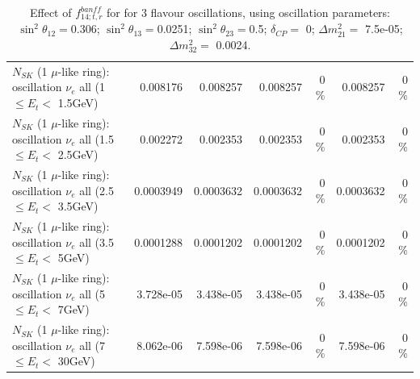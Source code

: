 \begin{table}
\begin{tabular}{| l | r | r | r  r | r  r |}
$N_{SK}$ (1 $\mu$-like ring): oscillation $\nu_{e}$ all (1 $\leq E_{t} <$ 1.5GeV) &        0.008176 &        0.008257 &        0.008257 &        0 \%  &        0.008257 &        0 \%  \\ 
$N_{SK}$ (1 $\mu$-like ring): oscillation $\nu_{e}$ all (1.5 $\leq E_{t} <$ 2.5GeV) &        0.002272 &        0.002353 &        0.002353 &        0 \%  &        0.002353 &        0 \%  \\ 
$N_{SK}$ (1 $\mu$-like ring): oscillation $\nu_{e}$ all (2.5 $\leq E_{t} <$ 3.5GeV) &       0.0003949 &       0.0003632 &       0.0003632 &        0 \%  &       0.0003632 &        0 \%  \\ 
$N_{SK}$ (1 $\mu$-like ring): oscillation $\nu_{e}$ all (3.5 $\leq E_{t} <$ 5GeV) &       0.0001288 &       0.0001202 &       0.0001202 &        0 \%  &       0.0001202 &        0 \%  \\ 
 $N_{SK}$ (1 $\mu$-like ring): oscillation $\nu_{e}$ all (5 $\leq E_{t} <$ 7GeV) &       3.728e-05 &       3.438e-05 &       3.438e-05 &        0 \%  &       3.438e-05 &        0 \%  \\ 
$N_{SK}$ (1 $\mu$-like ring): oscillation $\nu_{e}$ all (7 $\leq E_{t} <$ 30GeV) &       8.062e-06 &       7.598e-06 &       7.598e-06 &        0 \%  &       7.598e-06 &        0 \%  \\ 
\hline
\hline
\end{tabular}
\caption{ Effect of $f_{14; t, r}^{banff}$ for for 3 flavour oscillations, using oscillation parameters:  $\sin^2\theta_{12} = $0.306; $\sin^2\theta_{13} = $0.0251; $\sin^2\theta_{23} = $0.5; $\delta_{CP} = $        0; $\Delta m^2_{21} = $    7.5e-05; $\Delta m^2_{32} = $    0.0024. }
\label{tab:num_banff_14_1RmuT_3f_osc_t13:0.0251}
\end{table}
\clearpage
